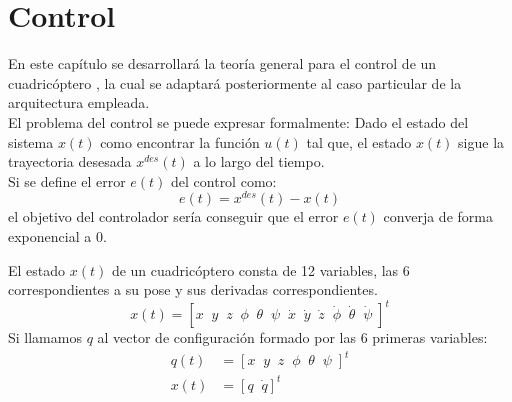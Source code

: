 \section{}


\chapter{Control}
En este capítulo se desarrollará la teoría general para el control de un cuadricóptero , la cual se adaptará posteriormente al caso particular de la arquitectura empleada.\\

El problema del control se puede expresar formalmente: 
Dado el estado del sistema $x(t)$ 
como encontrar la función $u(t)$ tal que, el estado $x(t)$ sigue la trayectoria desesada $x^{des}(t)$ a lo largo del tiempo.\\
Si se define el error $e(t)$ del control como:
\begin{equation}
	e(t) = x^{des}(t) - x(t)
\end{equation}
el objetivo del controlador sería conseguir que el error $e(t)$ converja de forma exponencial a 0.


El estado $x(t)$ de un cuadricóptero consta de 12 variables, las 6 correspondientes a su pose y sus derivadas correspondientes.
\begin{equation}
	x(t) = \left[
	x  \;\;
	y  \;\;
	z  \;\;
	\phi  \;\;
	\theta  \;\;
	\psi  \;\;
	\dot{x}  \;\;
	\dot{y}  \;\;
	\dot{z}  \;\;
	\dot{\phi}  \;\;
	\dot{\theta}  \;\;
	\dot{\psi}\;\right]^t
\end{equation}
Si llamamos $q$ al vector de configuración formado por las 6 primeras variables:
\begin{align}
	q(t) &= \left[
	x  \;\;
	y  \;\;
	z  \;\;
	\phi  \;\;
	\theta  \;\;
	\psi  \;\right]^t\\
	x(t) &= \left[q \;\; \dot{q}\right]^t
\end{align}


